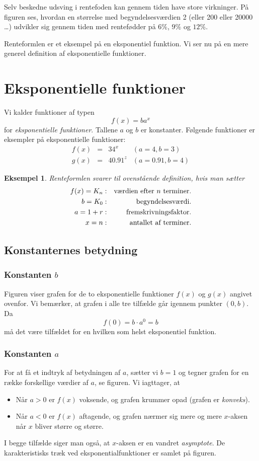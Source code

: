 \documentclass[12pt,oneside,a4paper]{article}
\newcommand{\bas}{\begin{eqnarray*}}
\newcommand{\eas}{\end{eqnarray*}}
\newtheorem{eks}[thm]{Eksempel}
\begin{document}
Selv beskedne udsving i rentefoden kan gennem tiden have store virkninger. På figuren
ses, hvordan en størrelse med begyndelsesværdien 2 (eller 200 eller 20000 \ldots) udvikler
sig gennem tiden med rentefødder på $6\%$, $9\%$ og $12\%$.

Renteformlen er et eksempel på en eksponentiel funktion. Vi ser nu på en mere generel
definition af eksponentielle funktioner.

\section{Eksponentielle funktioner}
Vi kalder funktioner af typen
$$
f(x) = ba^x
$$
for {\em eksponentielle funktioner}. Tallene $a$ og $b$ er konstanter. Følgende funktioner er 
eksempler på eksponentielle funktioner:
$$
\begin{array}{rcll}
    f(x) &=& 3 4^x & (a=4, b=3) \\
    g(x) &=& 4 0.91^z & (a=0.91, b=4) 
\end{array}
$$

\begin{eks}
    Renteformlen svarer til ovenstående definition, hvis man sætter
    \bas
    f(x) = K_n & : & \hbox{værdien efter $n$ terminer.} \\
       b = K_0 & : & \hbox{begyndelsesværdi.} \\
       a = 1+r & : & \hbox{fremskrivningsfaktor.} \\
       x = n   & : & \hbox{antallet af terminer.}
    \eas
\end{eks}

\subsection{Konstanternes betydning}
\subsubsection{Konstanten $b$}
Figuren viser grafen for de to eksponentielle funktioner $f(x)$ og $g(x)$
angivet ovenfor. Vi bemærker, at grafen i alle tre tilfælde går igennem punkter $(0, b)$.
Da
$$
f(0) = b\cdot a^0 = b
$$
må det være tilfældet for en hvilken som helst eksponentiel funktion.

\subsubsection{Konstanten $a$}
For at få et indtryk af betydningen af $a$, sætter vi $b=1$ og tegner grafen
for en række forskellige værdier af $a$, se figuren. Vi iagttager, at 
\begin{itemize}
    \item Når $a>0$ er $f(x)$ voksende, og grafen krummer opad (grafen er {\em konveks}).
    \item Når $a<0$ er $f(x)$ aftagende, og grafen nærmer sig mere og mere
        $x$-aksen når $x$ bliver større og større.
\end{itemize}
I begge tilfælde siger man også, at $x$-aksen er en vandret {\em asymptote}.
De karakteristisks træk ved eksponentialfunktioner er samlet på figuren.
\end{document}

